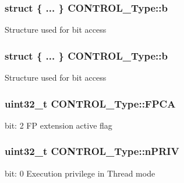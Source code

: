\subsubsection[{\texorpdfstring{b}{b}}]{\setlength{\rightskip}{0pt plus 5cm}struct \{ ... \}   C\+O\+N\+T\+R\+O\+L\+\_\+\+Type\+::b}\hypertarget{unionCONTROL__Type_aa4d954e3b3024e7d3f2e7fb52b1cfa77}{}\label{unionCONTROL__Type_aa4d954e3b3024e7d3f2e7fb52b1cfa77}
Structure used for bit access 
\subsubsection[{\texorpdfstring{b}{b}}]{\setlength{\rightskip}{0pt plus 5cm}struct \{ ... \}   C\+O\+N\+T\+R\+O\+L\+\_\+\+Type\+::b}\hypertarget{unionCONTROL__Type_a7aae9f0619396a9723627416a6a79fb6}{}\label{unionCONTROL__Type_a7aae9f0619396a9723627416a6a79fb6}
Structure used for bit access 
\subsubsection[{\texorpdfstring{F\+P\+CA}{FPCA}}]{\setlength{\rightskip}{0pt plus 5cm}uint32\+\_\+t C\+O\+N\+T\+R\+O\+L\+\_\+\+Type\+::\+F\+P\+CA}\hypertarget{unionCONTROL__Type_ac62cfff08e6f055e0101785bad7094cd}{}\label{unionCONTROL__Type_ac62cfff08e6f055e0101785bad7094cd}
bit\+: 2 FP extension active flag 
\subsubsection[{\texorpdfstring{n\+P\+R\+IV}{nPRIV}}]{\setlength{\rightskip}{0pt plus 5cm}uint32\+\_\+t C\+O\+N\+T\+R\+O\+L\+\_\+\+Type\+::n\+P\+R\+IV}\hypertarget{unionCONTROL__Type_a35c1732cf153b7b5c4bd321cf1de9605}{}\label{unionCONTROL__Type_a35c1732cf153b7b5c4bd321cf1de9605}
bit\+: 0 Execution privilege in Thread mode 
